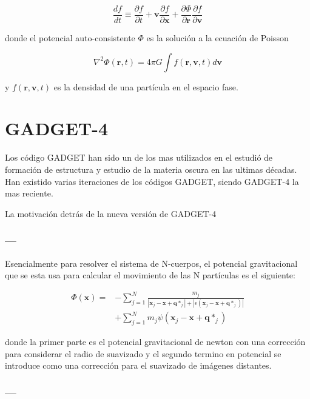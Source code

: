 \begin{equation}
\frac{d f}{d t} \equiv \frac{\partial f}{\partial t} + \mathbf{v}\frac{\partial f}{\partial \mathbf{x}} + \frac{\partial \Phi}{\partial \mathbf{r}} \frac{\partial f}{\partial \mathbf{v}}
\label{CBE}
\end{equation}

donde el potencial auto-consistente $\Phi$ es la solución a la ecuación de Poisson

\begin{equation}
\nabla^2\Phi(\mathbf{r},t) = 4\pi G \int f(\mathbf{r},\mathbf{v},t)d\mathbf{v}
\label{PoissonSol}
\end{equation}

y $f(\mathbf{r},\mathbf{v},t)$ es la densidad de una partícula en el espacio fase.




\section{GADGET-4}
Los código GADGET han sido un de los mas utilizados en el estudió de formación de estructura y estudio de la materia oscura en las ultimas décadas. Han existido varias iteraciones de los códigos GADGET, siendo GADGET-4 la mas reciente.

La motivación detrás de la nueva versión de GADGET-4
\cite{2021MNRAS.506.2871S}






\subsubsection{---}
Esencialmente para resolver el sistema de N-cuerpos, el potencial gravitacional que se esta usa para calcular el movimiento de las N partículas es el siguiente:

\begin{align}
    \Phi (\textbf{x}) = &- \sum_{j=1}^{N} \frac{m_j}{|\textbf{x}_j-\textbf{x}+\textbf{q}*_j| + |\epsilon(\textbf{x}_j-\textbf{x}+\textbf{q}*_j)|} \nonumber \\
    &+ \sum_{j=1}^{N} m_j \psi (\textbf{x}_j-\textbf{x}+\textbf{q}*_j)
\end{align}

donde la primer parte es el potencial gravitacional de newton con una corrección para considerar el radio de suavizado y el segundo termino en potencial se introduce como una corrección para el suavizado de imágenes distantes.


\subsubsection{---}
